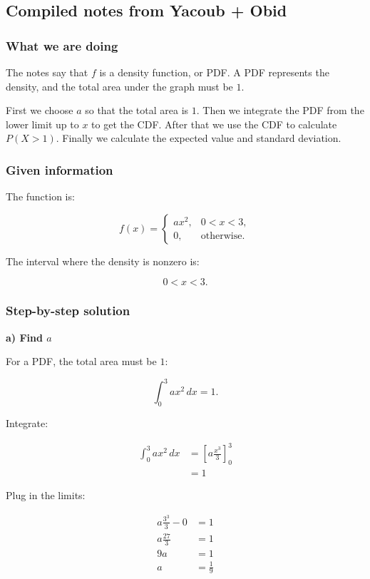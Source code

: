 \documentclass[10pt]{article}
\begin{document}
\subsection*{Compiled notes from Yacoub + Obid}

\subsubsection*{What we are doing}
The notes say that $f$ is a density function, or PDF.
A PDF represents the density, and the total area under the graph
must be $1$.

First we choose $a$ so that the total area is $1$.
Then we integrate the PDF from the lower limit up to $x$ to get
the CDF.
After that we use the CDF to calculate $P(X>1)$.
Finally we calculate the expected value and standard deviation.

\subsubsection*{Given information}
The function is:

\[
f(x)=
\begin{cases}
ax^2,
& 0<x<3,\\
0,
& \text{otherwise.}
\end{cases}
\]

The interval where the density is nonzero is:

\[
0<x<3.
\]

\subsubsection*{Step-by-step solution}

\textbf{a) Find $a$}

For a PDF, the total area must be $1$:

\[
\int_0^3 ax^2\,dx=1.
\]

Integrate:

\begin{align*}
\int_0^3 ax^2\,dx
&=
\left[
a\frac{x^3}{3}
\right]_0^3 \\[2mm]
&=1
\end{align*}

Plug in the limits:

\begin{align*}
a\frac{3^3}{3}-0
&=1 \\[2mm]
a\frac{27}{3}
&=1 \\[2mm]
9a
&=1 \\[2mm]
a
&=\frac{1}{9}
\end{align*}
\end{document}
